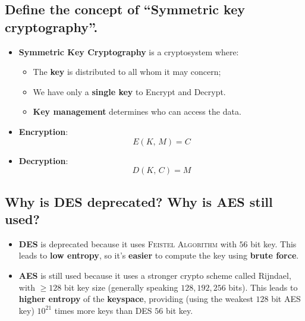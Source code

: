 \documentclass[9pt, letterpaper]{article}
\begin{document}
\subsection{Define the concept of “Symmetric key cryptography”.}
\begin{itemize}
	\item \textbf{Symmetric Key Cryptography} is a cryptosystem where:
	      \begin{itemize}
		      \item The \textbf{key} is distributed to all whom it may concern;
		      \item We have only a \textbf{single key} to Encrypt and Decrypt.
		      \item \textbf{Key management} determines who can access the data.
	      \end{itemize}
	\item \textbf{Encryption}: $$E(K \mbox{, }M) = C$$
	\item \textbf{Decryption}: $$D(K \mbox{, }C) = M$$
\end{itemize}


\subsection{Why is DES deprecated? Why is AES still used?}
\begin{itemize}
	\item \textbf{DES} is deprecated because it uses \textsc{Feistel Algorithm} with $56$ bit key. This leads to \textbf{low entropy}, so it's \textbf{easier} to compute the key using \textbf{brute force}.
	\item \textbf{AES} is still used because it uses a stronger crypto scheme called Rijndael, with $\ge 128$ bit key size (generally speaking $128,192,256$ bits). This leads to \textbf{higher entropy} of the \textbf{keyspace}, providing (using the weakest $128$ bit AES key) $10^{21}$ times more keys than DES $56$ bit key.
\end{itemize}
\end{document}
